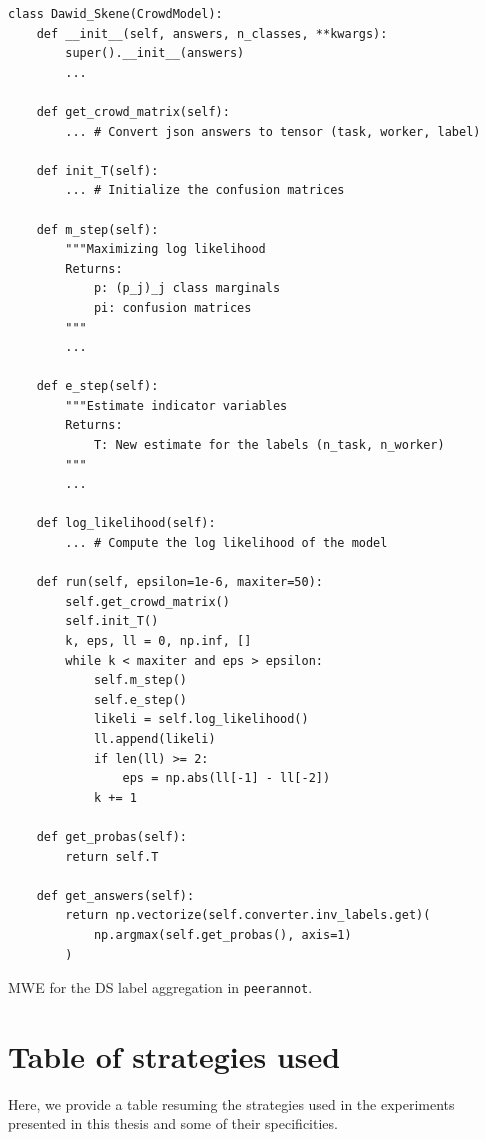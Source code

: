 \begin{listing}[ht]
    \begin{verbatim}
class Dawid_Skene(CrowdModel):
    def __init__(self, answers, n_classes, **kwargs):
        super().__init__(answers)
        ...

    def get_crowd_matrix(self):
        ... # Convert json answers to tensor (task, worker, label)

    def init_T(self):
        ... # Initialize the confusion matrices

    def m_step(self):
        """Maximizing log likelihood
        Returns:
            p: (p_j)_j class marginals
            pi: confusion matrices
        """
        ...

    def e_step(self):
        """Estimate indicator variables
        Returns:
            T: New estimate for the labels (n_task, n_worker)
        """
        ...

    def log_likelihood(self):
        ... # Compute the log likelihood of the model

    def run(self, epsilon=1e-6, maxiter=50):
        self.get_crowd_matrix()
        self.init_T()
        k, eps, ll = 0, np.inf, []
        while k < maxiter and eps > epsilon:
            self.m_step()
            self.e_step()
            likeli = self.log_likelihood()
            ll.append(likeli)
            if len(ll) >= 2:
                eps = np.abs(ll[-1] - ll[-2])
            k += 1

    def get_probas(self):
        return self.T

    def get_answers(self):
        return np.vectorize(self.converter.inv_labels.get)(
            np.argmax(self.get_probas(), axis=1)
        )
\end{verbatim}
\caption{MWE for the DS label aggregation in \texttt{peerannot}.}
\label{listing:DS}
\end{listing}

\clearpage

\section{Table of strategies used}
\label{sec:tab-strategies}
Here, we provide a table resuming the strategies used in the experiments presented in this thesis and some of their specificities.

